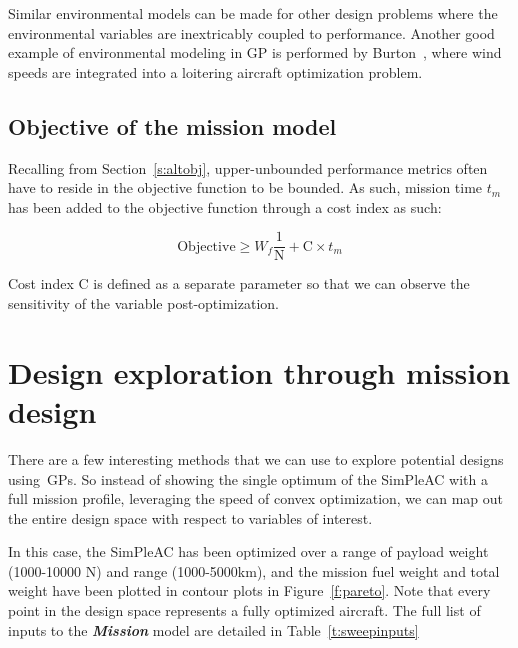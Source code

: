 Similar environmental models can be made for other design problems where the environmental
variables are inextricably coupled to performance. Another good example of environmental modeling
in \gls{GP} is performed by Burton~\cite{gassolar}, where wind speeds are integrated into
a loitering aircraft optimization problem.

\subsection{Objective of the mission model}

Recalling from Section~\ref{s:altobj}, upper-unbounded performance metrics often have to
reside in the objective function to be bounded. As such, mission time $t_m$ has been added
to the objective function through a cost index as such:

\begin{equation}
    \mathrm{Objective} \geq W_f \frac{1}{\mathrm{N}} + \mathrm{C} \times t_m
    \label{e:missionobj}
\end{equation}

Cost index $\mathrm{C}$ is defined as a separate parameter so that we can observe the sensitivity
of the variable post-optimization.

\section{Design exploration through mission design}

There are a few interesting methods that we can use to explore
potential designs using~\gls{GP}s. So instead of showing the single optimum of the
SimPleAC with a full mission profile, leveraging the speed of convex optimization,
we can map out the entire design space with respect to variables of interest.

In this case, the SimPleAC has been optimized
over a range of payload weight (1000-10000 N) and range (1000-5000km), and the mission fuel weight
and total weight have been plotted in contour plots in Figure~\ref{f:pareto}. Note that
every point in the design space represents a fully optimized aircraft. The full list of inputs
to the \textbf{\textit{Mission}} model are detailed in Table~\ref{t:sweepinputs}

